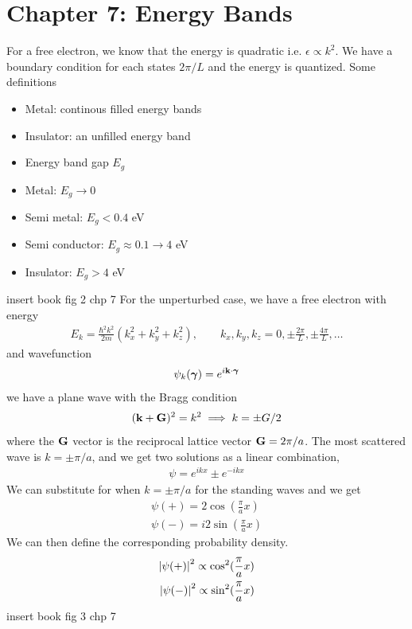 \documentclass[../main.tex]{subfiles}
\begin{document}
\pagestyle{fancy}

\section*{Chapter 7: Energy Bands}

For a free electron, we know that the energy is quadratic i.e. $\epsilon \propto k^2$. We have a 
boundary condition for each states $2\pi/L$ and the energy is quantized. Some definitions
\begin{itemize}
    \item Metal: continous filled energy bands
    \item Insulator: an unfilled energy band
    \item Energy band gap $E_g$
    \item Metal: $E_g \to 0$
    \item Semi metal: $E_g < 0.4$ eV 
    \item Semi conductor: $E_g \approx 0.1 \to 4$ eV
    \item Insulator: $E_g > 4$ eV
\end{itemize}
insert book fig 2 chp 7
For the unperturbed case, we have a free electron with energy
\begin{align*}
    E_k = \frac{\hbar^2 k^2}{2m}(k_x^2 + k_y^2 + k_z^2), \qquad k_x, k_y, k_z = 0, \pm \frac{2\pi}{L}, \pm \frac{4\pi}{L}, \dots
\end{align*}
and wavefunction 
\begin{align*}
    \psi_k(\vb* \gamma) = e^{i \vb k \cdot \vb* \gamma}
\end{align*}
we have a plane wave with the Bragg condition
\begin{align*}
    (\vb k + \vb G)^2 = k^2 \implies k = \pm G/2
\end{align*}
where the $\vb G$ vector is the reciprocal lattice vector $\vb G = 2\pi/a$. The most scattered 
wave is $ k = \pm \pi/a$, and we get two solutions as a linear combination,
\begin{align*}
    \psi = e^{ikx} \pm e^{-ikx}
\end{align*}
We can substitute for when $k = \pm \pi/a$ for the standing waves and we get
\begin{align*}
    \psi(+) = 2 \cos(\frac{\pi}{a}x) \\
    \psi(-) = i2 \sin(\frac{\pi}{a}x)
\end{align*}
We can then define the corresponding probability density.
\begin{align*}
    \abs{\psi(+)}^2 \propto \cos^2(\frac{\pi}{a}x) \\
    \abs{\psi(-)}^2 \propto \sin^2(\frac{\pi}{a}x)
\end{align*}
insert book fig 3 chp 7
\end{document}

